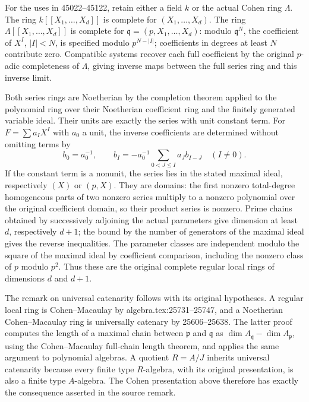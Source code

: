 For the uses in 45022--45122, retain either a field \(k\) or the actual Cohen ring \(\Lambda\). The ring \(k[[X_1,\ldots,X_d]]\) is complete for \((X_1,\ldots,X_d)\). The ring \(\Lambda[[X_1,\ldots,X_d]]\) is complete for \(\mathfrak q=(p,X_1,\ldots,X_d)\): modulo \(\mathfrak q^N\), the coefficient of \(X^I\), \(|I|<N\), is specified modulo \(p^{N-|I|}\); coefficients in degrees at least \(N\) contribute zero. Compatible systems recover each full coefficient by the original \(p\)-adic completeness of \(\Lambda\), giving inverse maps between the full series ring and this inverse limit.

Both series rings are Noetherian by the completion theorem applied to the polynomial ring over their Noetherian coefficient ring and the finitely generated variable ideal. Their units are exactly the series with unit constant term. For \(F=\sum a_IX^I\) with \(a_0\) a unit, the inverse coefficients are determined without omitting terms by \[
 b_0=a_0^{-1},\qquad
 b_I=-a_0^{-1}\sum_{0<J\leq I}a_Jb_{I-J}\quad(I\ne0).
\] If the constant term is a nonunit, the series lies in the stated maximal ideal, respectively \((X)\) or \((p,X)\). They are domains: the first nonzero total-degree homogeneous parts of two nonzero series multiply to a nonzero polynomial over the original coefficient domain, so their product series is nonzero. Prime chains obtained by successively adjoining the actual parameters give dimension at least \(d\), respectively \(d+1\); the bound by the number of generators of the maximal ideal gives the reverse inequalities. The parameter classes are independent modulo the square of the maximal ideal by coefficient comparison, including the nonzero class of \(p\) modulo \(p^2\). Thus these are the original complete regular local rings of dimensions \(d\) and \(d+1\).

The remark on universal catenarity follows with its original hypotheses. A regular local ring is Cohen--Macaulay by algebra.tex:25731--25747, and a Noetherian Cohen--Macaulay ring is universally catenary by 25606--25638. The latter proof computes the length of a maximal chain between \(\mathfrak p\) and \(\mathfrak q\) as \(\dim A_{\mathfrak q}-\dim A_{\mathfrak p}\), using the Cohen--Macaulay full-chain length theorem, and applies the same argument to polynomial algebras. A quotient \(R=A/J\) inherits universal catenarity because every finite type \(R\)-algebra, with its original presentation, is also a finite type \(A\)-algebra. The Cohen presentation above therefore has exactly the consequence asserted in the source remark.

